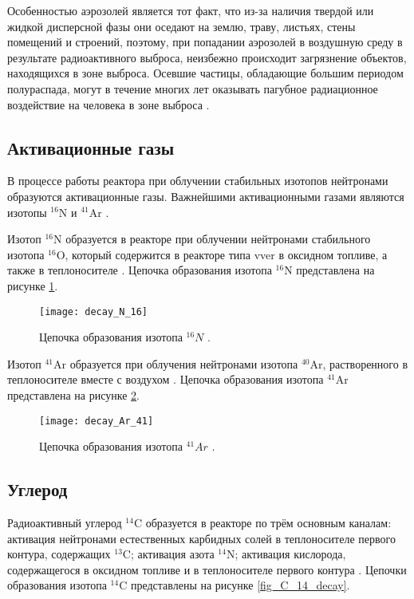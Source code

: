 Особенностью аэрозолей является тот факт, что из-за наличия твердой или жидкой дисперсной фазы они оседают на землю, 
траву, листьях, стены помещений и строений, поэтому, при попадании аэрозолей в воздушную среду в результате 
радиоактивного выброса, неизбежно происходит загрязнение объектов, находящихся в зоне выброса. Осевшие частицы, 
обладающие большим периодом полураспада, могут в течение многих лет оказывать пагубное радиационное воздействие на 
человека в зоне выброса \cite{nuc_waste}.

\subsection{Активационные газы}

В процессе работы реактора при облучении стабильных изотопов нейтронами образуются активационные газы. Важнейшими 
активационными газами являются изотопы $^{16}\text{N}$ и $^{41}\text{Ar}$ \cite{gusev_bio}. 

Изотоп $^{16}\text{N}$ образуется в реакторе при облучении нейтронами стабильного изотопа $^{16}\text{O}$, который 
содержится в реакторе типа \ac{vver} в оксидном топливе, а также в теплоносителе \cite{gusev_bio}. Цепочка образования 
изотопа $^{16}\text{N}$ представлена на рисунке \ref{fig_N_16_decay}.

\begin{figure}[ht!]
    \centering
    \texttt{[image: decay\_N\_16]}
    \captionsetup{justification=centering}
    \caption{Цепочка образования изотопа $^{16}N$ \cite{periodic_table}.}
    \label{fig_N_16_decay}
\end{figure}

Изотоп $^{41}\text{Ar}$ образуется при облучения нейтронами изотопа $^{40}\text{Ar}$, растворенного в теплоносителе 
вместе с воздухом \cite{gusev_bio}. Цепочка образования изотопа $^{41}\text{Ar}$ представлена на рисунке 
\ref{fig_Ar_41_decay}.

\begin{figure}[ht!]
    \centering
    \texttt{[image: decay\_Ar\_41]}
    \captionsetup{justification=centering}
    \caption{Цепочка образования изотопа $^{41}Ar$ \cite{periodic_table}.}
    \label{fig_Ar_41_decay}
\end{figure}

\subsection{Углерод}

Радиоактивный углерод $^{14}\text{C}$ образуется в реакторе по трём основным каналам: активация нейтронами естественных 
карбидных солей в теплоносителе первого контура, содержащих $^{13}\text{C}$; активация азота $^{14}\text{N}$; активация 
кислорода, содержащегося в оксидном топливе и в теплоносителе первого контура \cite{bekman_nuclear}. Цепочки образования 
изотопа $^{14}\text{C}$ представлены на рисунке \ref{fig_C_14_decay}.

